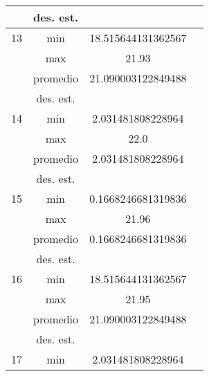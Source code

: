 \documentclass{report}
\begin{document}
\begin{table}[ht]
\begin{tabular}{|c|c|c|c|}
                              & des. est.                   &            &        \\ \hline
        13                    & min                         &       18.515644131362567     &        \\ \cline{2-4} 
                              & max                         &     21.93       &        \\ \cline{2-4} 
                              & promedio                    &    21.090003122849488        &        \\ \cline{2-4} 
                              & des. est.                   &            &        \\ \hline
        14                    & min                         &      2.031481808228964      &        \\ \cline{2-4} 
                              & max                         &     22.0       &        \\ \cline{2-4} 
                              & promedio                    &     2.031481808228964       &        \\ \cline{2-4} 
                              & des. est.                   &            &        \\ \hline
        15                    & min                         &     0.1668246681319836       &        \\ \cline{2-4} 
                              & max                         &      21.96      &        \\ \cline{2-4} 
                              & promedio                    &      0.1668246681319836      &        \\ \cline{2-4} 
                              & des. est.                   &            &        \\ \hline
        16                    & min                         &      18.515644131362567      &        \\ \cline{2-4} 
                              & max                         &       21.95     &        \\ \cline{2-4} 
                              & promedio                    &     21.090003122849488       &        \\ \cline{2-4} 
                              & des. est.                   &            &        \\ \hline
        17                    & min                         &      2.031481808228964      &        \\ \cline{2-4} 

\end{tabular}
\end{table}
\end{document}
